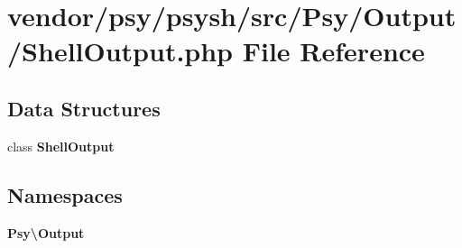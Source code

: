 \section{vendor/psy/psysh/src/\+Psy/\+Output/\+Shell\+Output.php File Reference}
\label{_shell_output_8php}
\subsection*{Data Structures}
\begin{DoxyCompactItemize}
\item 
class {\bf Shell\+Output}
\end{DoxyCompactItemize}
\subsection*{Namespaces}
\begin{DoxyCompactItemize}
\item 
 {\bf Psy\textbackslash{}\+Output}
\end{DoxyCompactItemize}
